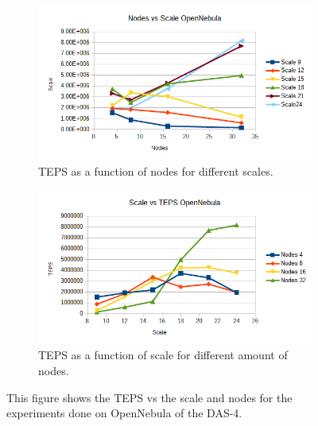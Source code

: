 \begin{figure}[!h]
\centering
\begin{subfigure}{.5\textwidth}
  \centering
  \includegraphics[width=\linewidth]{images/nodes_opennebula.png}
  \caption{TEPS as a function of nodes for different scales.}
  \label{fig:nodes_opennebula}
\end{subfigure}%
\begin{subfigure}{.5\textwidth}
  \centering
  \includegraphics[width=\linewidth]{images/scale_opennebula.png}
  \caption{TEPS as a function of scale for different amount of nodes.}
  \label{fig:scale_opennebula}
\end{subfigure}
\caption{This figure shows the TEPS vs the scale and nodes for the experiments done on OpenNebula of the DAS-4.}
\label{fig:das_opennebula}
\end{figure}

